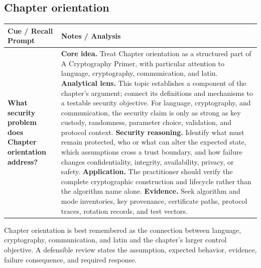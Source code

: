 \documentclass[11pt]{article}
\newcommand{\CornellHeader}{%
\rowcolor{Navy}\color{white}\bfseries Cue / Recall Prompt & \color{white}\bfseries Notes / Analysis\\\hline}
\newcommand{\CornellRow}[2]{%
\cellcolor{CueGray}\RaggedRight\textbf{#1} & \RaggedRight #2\\\hline}
\begin{document}
\subsection*{Chapter orientation}
\begin{longtable}{>{\RaggedRight\arraybackslash}p{}|>{\RaggedRight\arraybackslash}p{}}
\CornellHeader
\CornellRow{What security problem does Chapter orientation address?}{\textbf{Core idea.} Treat Chapter orientation as a structured part of A Cryptography Primer, with particular attention to language, cryptography, communication, and latin. \textbf{Analytical lens.} This topic establishes a component of the chapter's argument; connect its definitions and mechanisms to a testable security objective. For language, cryptography, and communication, the security claim is only as strong as key custody, randomness, parameter choice, validation, and protocol context. \textbf{Security reasoning.} Identify what must remain protected, who or what can alter the expected state, which assumptions cross a trust boundary, and how failure changes confidentiality, integrity, availability, privacy, or safety. \textbf{Application.} The practitioner should verify the complete cryptographic construction and lifecycle rather than the algorithm name alone. \textbf{Evidence.} Seek algorithm and mode inventories, key provenance, certificate paths, protocol traces, rotation records, and test vectors.}
\end{longtable}
\begin{topicsummary}
Chapter orientation is best remembered as the connection between language, cryptography, communication, and latin and the chapter's larger control objective. A defensible review states the assumption, expected behavior, evidence, failure consequence, and required response.
\end{topicsummary}
\end{document}
